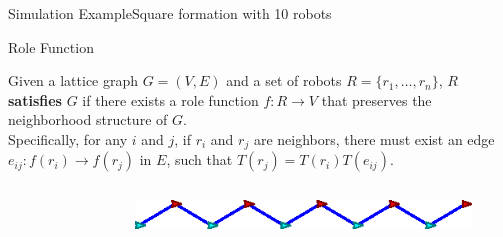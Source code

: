 \documentclass[10pt]{beamer}
\newcommand{\edge}[3]{{#1}\overset{#2}{\longrightarrow}{#3}}
\begin{document}
\begin{frame}{Simulation Example}{Square formation with 10 robots}
  \begin{center}
  \end{center}
\end{frame}

\begin{frame}{Role Function}
  \begin{definition}
    \small{Given a lattice graph $G=(V, E)$ and a set of robots $R = \{
    r_1, \ldots, r_n \}$, $R$ \textbf{satisfies} $G$ if
    there exists a role function $f: R \rightarrow V$ that preserves
    the neighborhood structure of $G$.
    \\
    Specifically, for any $i$ and $j$, if $r_i$ and $r_j$ are neighbors, 
    there must exist an edge
    $e_{ij}: \edge{f(r_i)}{}{f(r_j)}$ in $E$, such that
    $ T(r_j) = T(r_i) T(e_{ij})$.}
  \end{definition}
  \begin{columns}[T] 
    \begin{column}{.4\textwidth}
      \begin{figure}
        \centering
      \end{figure}
    \end{column}%
    \begin{column}{.5\textwidth}
      \begin{figure}
        \centering
        \includegraphics[width=0.75\linewidth]{figs/bad-hexagon}

\end{figure}
\end{column}
\end{columns}
\end{frame}
\end{document}
